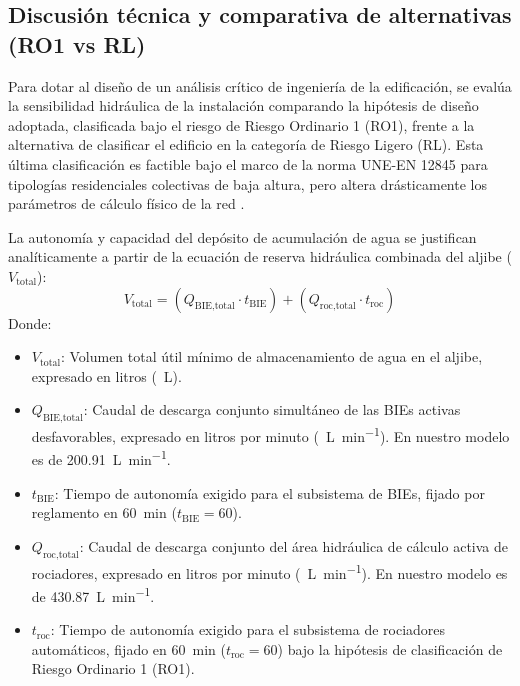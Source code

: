 \documentclass[12pt,a4paper]{article}
\begin{document}
\subsection{Discusión técnica y comparativa de alternativas (RO1 vs RL)}

Para dotar al diseño de un análisis crítico de ingeniería de la edificación, se evalúa la sensibilidad hidráulica de la instalación comparando la hipótesis de diseño adoptada, clasificada bajo el riesgo de Riesgo Ordinario 1 (RO1), frente a la alternativa de clasificar el edificio en la categoría de Riesgo Ligero (RL). Esta última clasificación es factible bajo el marco de la norma UNE-EN 12845 para tipologías residenciales colectivas de baja altura, pero altera drásticamente los parámetros de cálculo físico de la red \parencite{UNE_EN_12845}. 

La autonomía y capacidad del depósito de acumulación de agua se justifican analíticamente a partir de la ecuación de reserva hidráulica combinada del aljibe ($V_{\text{total}}$):
\begin{equation}
V_{\text{total}} = \left( Q_{\text{BIE}, \text{total}} \cdot t_{\text{BIE}} \right) + \left( Q_{\text{roc}, \text{total}} \cdot t_{\text{roc}} \right)
\label{eq:volumen_aljibe}
\end{equation}
Donde:
\begin{itemize}
	\item $V_{\text{total}}$: Volumen total útil mínimo de almacenamiento de agua en el aljibe, expresado en litros (\SI{}{\liter}).
	\item $Q_{\text{BIE}, \text{total}}$: Caudal de descarga conjunto simultáneo de las BIEs activas desfavorables, expresado en litros por minuto (\SI{}{\liter\per\minute}). En nuestro modelo es de \SI{200.91}{\liter\per\minute}.
	\item $t_{\text{BIE}}$: Tiempo de autonomía exigido para el subsistema de BIEs, fijado por reglamento en \SI{60}{\minute} ($t_{\text{BIE}} = 60$).
	\item $Q_{\text{roc}, \text{total}}$: Caudal de descarga conjunto del área hidráulica de cálculo activa de rociadores, expresado en litros por minuto (\SI{}{\liter\per\minute}). En nuestro modelo es de \SI{430.87}{\liter\per\minute}.
	\item $t_{\text{roc}}$: Tiempo de autonomía exigido para el subsistema de rociadores automáticos, fijado en \SI{60}{\minute} ($t_{\text{roc}} = 60$) bajo la hipótesis de clasificación de Riesgo Ordinario 1 (RO1).
\end{itemize}
\end{document}
